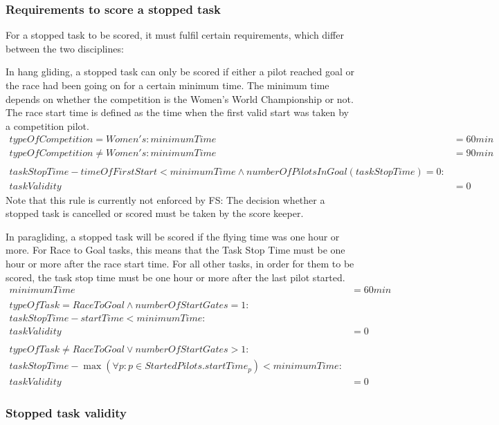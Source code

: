 \documentclass{article}
\begin{document}
\subsubsection{Requirements to score a stopped task}
For a stopped task to be scored, it must fulfil certain requirements, which differ between the two
disciplines:

In hang gliding, a stopped task can only be scored if either a pilot reached goal or the race had been
going on for a certain minimum time. The minimum time depends on whether the competition is the
Women’s World Championship or not. The race start time is defined as the time when the first valid
start was taken by a competition pilot.
\begin{align*}
    typeOfCompetition = Women's : minimumTime &= 60min \\
    typeOfCompetition \neq Women's : minimumTime &= 90min \\
    \\
    taskStopTime - timeOfFirstStart < minimumTime \land numberOfPilotsInGoal(taskStopTime) = 0 : \\
    taskValidity &= 0
\end{align*}
Note that this rule is currently not enforced by FS: The decision whether a stopped task is cancelled or
scored must be taken by the score keeper.

In paragliding, a stopped task will be scored if the flying time was one hour or more. For Race to Goal
tasks, this means that the Task Stop Time must be one hour or more after the race start time. For all
other tasks, in order for them to be scored, the task stop time must be one hour or more after the last
pilot started.
\begin{align*}
    minimumTime &= 60min \\
    \\
    typeOfTask = RaceToGoal \land numberOfStartGates = 1 : \\
    taskStopTime - startTime < minimumTime : \\
    taskValidity &= 0 \\
    \\
    typeOfTask \neq RaceToGoal \lor numberOfStartGates > 1 : \\
    taskStopTime - \max(\forall p : p \in StartedPilots . startTime_p) < minimumTime : \\
    taskValidity &= 0
\end{align*}

\subsubsection{Stopped task validity}
\end{document}
